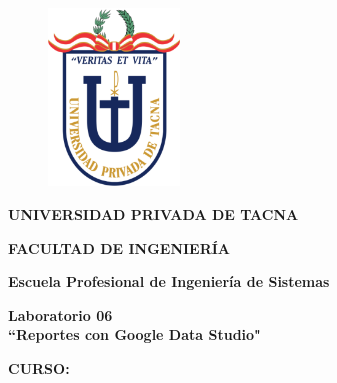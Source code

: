 \documentclass[12pt,letterpaper]{article}
\begin{document}
    \begin{titlepage}
        \begin{center}
            \begin{figure}[htb]
                \begin{center}
                    \includegraphics[width=3.5cm]{./img/logo}
                \end{center}
            \end{figure}
            \vspace*{0.15in}
            \begin{Large}
                \textbf{UNIVERSIDAD PRIVADA DE TACNA}\\
            \end{Large}
            \vspace*{0.15in}
            \begin{Large}
                \textbf{FACULTAD DE INGENIERÍA} \\
            \end{Large}
            \vspace*{0.1in}
            \begin{Large}
                \textbf{Escuela Profesional de Ingeniería de Sistemas} \\
            \end{Large}
            \vspace*{0.3in}
            \begin{Large}
                \textbf{Laboratorio 06}\\
                \textbf{``Reportes con Google Data Studio"}\\
            \end{Large}
            \vspace*{0.2in}
            \begin{Large}
                \textbf{CURSO:} \\
            \end{Large}
            \vspace*{0.1in}
            \begin{large}

\end{large}
\end{center}
\end{titlepage}
\end{document}
